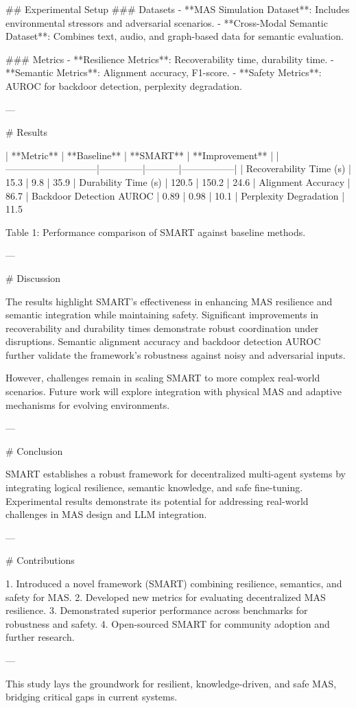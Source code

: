 ## Experimental Setup  
### Datasets  
- **MAS Simulation Dataset**: Includes environmental stressors and adversarial scenarios.
- **Cross-Modal Semantic Dataset**: Combines text, audio, and graph-based data for semantic evaluation.

### Metrics  
- **Resilience Metrics**: Recoverability time, durability time.
- **Semantic Metrics**: Alignment accuracy, F1-score.
- **Safety Metrics**: AUROC for backdoor detection, perplexity degradation.

---

# Results  

| **Metric**                  | **Baseline** | **SMART** | **Improvement** |
|-----------------------------|--------------|-----------|-----------------|
| Recoverability Time (s)     | 15.3         | 9.8       | 35.9%
| Durability Time (s)         | 120.5        | 150.2     | 24.6%
| Alignment Accuracy          | 86.7%
| Backdoor Detection AUROC    | 0.89         | 0.98      | 10.1%
| Perplexity Degradation      | 11.5%

Table 1: Performance comparison of SMART against baseline methods.

---

# Discussion  

The results highlight SMART's effectiveness in enhancing MAS resilience and semantic integration while maintaining safety. Significant improvements in recoverability and durability times demonstrate robust coordination under disruptions. Semantic alignment accuracy and backdoor detection AUROC further validate the framework's robustness against noisy and adversarial inputs.

However, challenges remain in scaling SMART to more complex real-world scenarios. Future work will explore integration with physical MAS and adaptive mechanisms for evolving environments.

---

# Conclusion  

SMART establishes a robust framework for decentralized multi-agent systems by integrating logical resilience, semantic knowledge, and safe fine-tuning. Experimental results demonstrate its potential for addressing real-world challenges in MAS design and LLM integration.

---

# Contributions  

1. Introduced a novel framework (SMART) combining resilience, semantics, and safety for MAS.  
2. Developed new metrics for evaluating decentralized MAS resilience.  
3. Demonstrated superior performance across benchmarks for robustness and safety.  
4. Open-sourced SMART for community adoption and further research.  

---

This study lays the groundwork for resilient, knowledge-driven, and safe MAS, bridging critical gaps in current systems.